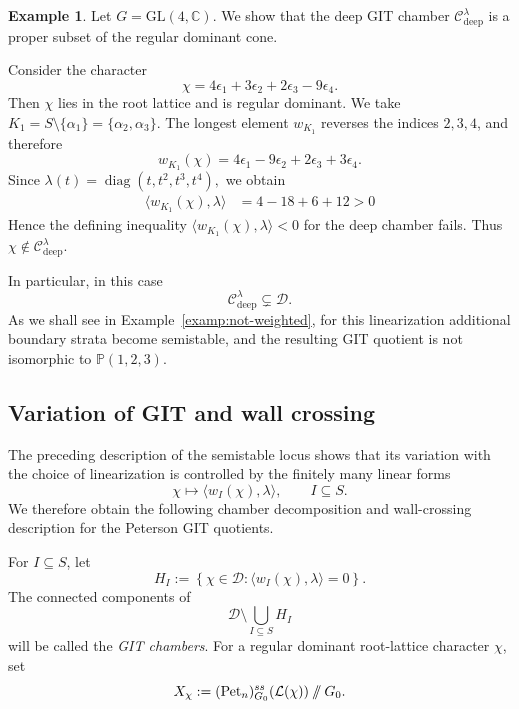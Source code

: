 \documentclass[12pt, reqno]{amsart}
\newcommand{\sslash}{\mathbin{/\mkern-6mu/}}
\theoremstyle{plain}
\numberwithin{equation}{section}
\theoremstyle{definition}
\newtheorem{example}{Example}
\begin{document}
\begin{example}\label{exam:not-in-deep}
Let \(G=\mathrm{GL}(4,\mathbb C)\). We show that the deep GIT chamber
\(\mathcal C_{\mathrm{deep}}^\lambda\) is a proper subset of the
regular dominant cone.

Consider the character
\[
\chi
=
4\epsilon_1+3\epsilon_2+2\epsilon_3-9\epsilon_4.
\]
Then \(\chi\) lies in the root lattice and is regular
dominant. We take $K_1=S\setminus\{\alpha_1\}
=
\{\alpha_2,\alpha_3\}.$
The longest element \(w_{K_1}\) reverses the indices
\(2,3,4\), and therefore
\[
w_{K_1}(\chi)
=
4\epsilon_1-9\epsilon_2+2\epsilon_3+3\epsilon_4.
\]
Since $
\lambda(t)=\operatorname{diag}(t,t^2,t^3,t^4),$
we obtain
\[
\begin{aligned}
\langle w_{K_1}(\chi),\lambda\rangle
&=
4-18+6+12 >0 \end{aligned}
\]
Hence the defining inequality $\langle w_{K_1}(\chi),\lambda\rangle<0$
for the deep chamber fails. Thus $\chi\notin\mathcal C_{\mathrm{deep}}^\lambda.$

In particular, in this case 
\[
\mathcal C_{\mathrm{deep}}^\lambda
\subsetneq\mathcal D.
\]
As we shall see in Example~\ref{examp:not-weighted}, for this
linearization additional boundary strata become semistable, and the
resulting GIT quotient is not isomorphic to
\(\mathbb P(1,2,3)\).
\end{example}


\subsection{Variation of GIT and wall crossing} The preceding description of the semistable locus shows that its variation with the choice of linearization is controlled by the finitely many linear forms
\[
\chi\longmapsto \langle w_I(\chi),\lambda\rangle,
\qquad I\subseteq S.
\]
We therefore obtain the following chamber decomposition and wall-crossing description for the Peterson GIT quotients.

For \(I\subseteq S\), let
\[
H_I
:=
\left\{
\chi\in\mathcal D:
\langle w_I(\chi),\lambda\rangle=0
\right\}.
\]
The connected components of
\[
\mathcal D\setminus\bigcup_{I\subseteq S}H_I
\]
will be called the \emph{GIT chambers}. For a regular dominant
root-lattice character \(\chi\), set
\[
X_\chi
:=
(\mathrm{Pet}_n)^{ss}_{G_0}(\mathcal L(\chi))
\sslash G_0.
\]
\end{document}
